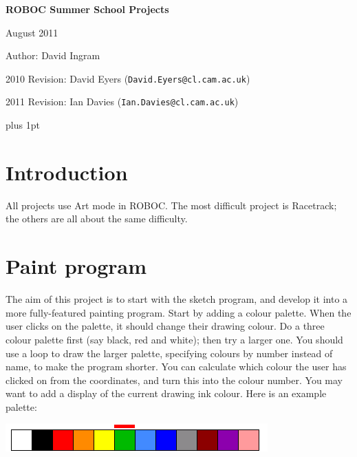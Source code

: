 \documentclass[12pt,a4paper,twoside]{article}
\renewcommand{\_}{\texttt{\symbol{95}}}
\begin{document}
\centerline{\textbf{\LARGE ROBOC Summer School Projects}}
\vspace{0.5cm}
\centerline{August 2011}
\centerline{Author: David Ingram}
\centerline{2010 Revision: David Eyers (\texttt{David.Eyers@cl.cam.ac.uk})}
\centerline{2011 Revision: Ian Davies (\texttt{Ian.Davies@cl.cam.ac.uk})}

{ \parskip 1mm plus 1pt \tableofcontents }

\section*{Introduction}

All projects use Art mode in ROBOC.
The most difficult project is Racetrack; the others are all about
the same difficulty.

\newpage
\section{Paint program}

The aim of this project is to start with the sketch program, and
develop it into a more fully-featured painting program. Start by
adding a colour palette. When the user clicks on the palette, it
should change their drawing colour. Do a three colour palette
first (say black, red and white); then try a larger one. You
should use a loop to draw the larger palette, specifying colours
by number instead of name, to make the program shorter. You can
calculate which colour the user has clicked on from the coordinates,
and turn this into the colour number. You may want to add a display
of the current drawing ink colour. Here is an example palette:

\begin{center}
\includegraphics[scale=0.6,angle=0]{screenshots/artpixel/paint/palette}
\end{center}
\end{document}
